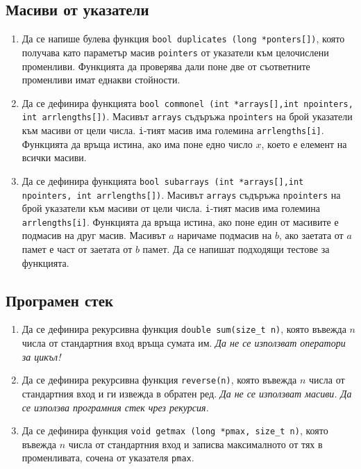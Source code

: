 \documentclass[12pt,a4paper]{article}
\newcommand{\code}[1]{\texttt{#1}}
\begin{document}
{\subsection {Масиви от указатели}
\begin{enumerate}[resume]
  \item Да се напише булева функция \code{bool duplicates (long *ponters[])}, която получава като параметър масив \code{pointers} от указатели към целочислени променливи. Функцията да проверява дали поне две от съответните променливи имат еднакви стойности.
  \item Да се дефинира функцията  \texttt{bool commonel (int *arrays[],int npointers, int arrlengths[])}. Масивът \texttt{arrays} съдъръжа \texttt{npointers} на брой указатели към масиви от цели числа. \texttt{i}-тият масив има големина \texttt{arrlengths[i]}. Функцията да връща истина, ако има поне едно число $x$, което е елемент на всички масиви.
  \item Да се дефинира функцията \texttt{bool subarrays (int *arrays[],int npointers, int arrlengths[])}. Масивът \texttt{arrays} съдъръжа \texttt{npointers} на брой указатели към масиви от цели числа. \texttt{i}-тият масив има големина \texttt{arrlengths[i]}. Функцията да връща истина, ако поне един от масивите е подмасив на друг масив. Масивът $a$ наричаме подмасив на $b$, ако заетата от $a$ памет е част от заетата от $b$ памет. Да се напишат подходящи тестове за функцията.
\end{enumerate}

\subsection {Програмен стек}
\begin{enumerate}[resume]
  \item Да се дефинира рекурсивна функция \code{double sum(size\_t n)}, която въвежда $n$ числа от стандартния вход връща сумата им. \emph{Да не се използват оператори за цикъл!}

  \item Да се дефинира рекурсивна функция \code{reverse(n)}, която въвежда $n$ числа от стандартния вход и ги извежда в обратен ред. \emph{Да не се използват масиви. Да се използва програмния стек чрез рекурсия.}

  \item Да се дефинира функция \code{void getmax (long *pmax, size\_t n)}, която въвежда $n$ числа от стандартния вход и записва максималното от тях в променливата, сочена от указателя \code{pmax}.


\end{enumerate}}
\end{document}
